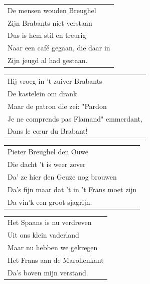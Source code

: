 \documentclass{article}
\begin{document}
\begin{flushleft}
\begin{tabularx}{0.8\textwidth} {
   >{\raggedright\arraybackslash}X}
\end{tabularx}
\end{flushleft}\begin{flushleft}
\begin{tabularx}{0.8\textwidth} {
   >{\raggedright\arraybackslash}X}
De mensen wouden Breughel\\
Zijn Brabants niet verstaan\\
Dus is hem stil en treurig\\
Naar een café gegaan, die daar in\\
Zijn jeugd al had gestaan.\\
\end{tabularx}
\end{flushleft}\begin{flushleft}
\begin{tabularx}{0.8\textwidth} {
   >{\raggedright\arraybackslash}X}
Hij vroeg in ’t zuiver Brabants\\
De kastelein om drank\\
Maar de patron die zei: "Pardon\\
Je ne comprends pas Flamand" emmerdant,\\
Dans le cœur du Brabant!\\
\end{tabularx}
\end{flushleft}\begin{flushleft}
\begin{tabularx}{0.8\textwidth} {
   >{\raggedright\arraybackslash}X}
Pieter Breughel den Ouwe\\
Die dacht ’t is weer zover\\
Da’ ze hier den Geuze nog brouwen\\
Da’s fijn maar dat ’t in ’t Frans moet zijn\\
Da vin’k een groot sjagrijn.\\
\end{tabularx}
\end{flushleft}\begin{flushleft}
\begin{tabularx}{0.8\textwidth} {
   >{\raggedright\arraybackslash}X}
Het Spaans is nu verdreven\\
Uit ons klein vaderland\\
Maar nu hebben we gekregen\\
Het Frans aan de Marollenkant\\
Da’s boven mijn verstand.\\
\end{tabularx}
\end{flushleft}\begin{flushleft}

\end{flushleft}
\end{document}
